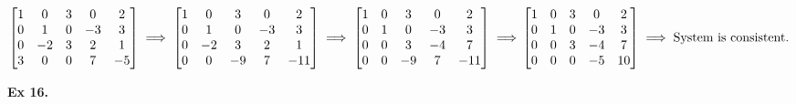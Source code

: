 \documentclass{article}
\begin{document}
$
\begin{bmatrix}
1 &0 &3 &0 &2\\
0 &1 &0 &-3 &3\\
0 &-2 &3 &2 &1\\
3 &0 &0 &7 &-5
\end{bmatrix}
\implies
\begin{bmatrix}
1 &0 &3 &0 &2\\
0 &1 &0 &-3 &3\\
0 &-2 &3 &2 &1\\
0 &0 &-9 &7 &-11
\end{bmatrix}
\implies
\begin{bmatrix}
1 &0 &3 &0 &2\\
0 &1 &0 &-3 &3\\
0 &0 &3 &-4 &7\\
0 &0 &-9 &7 &-11
\end{bmatrix}
\implies\\
\begin{bmatrix}
1 &0 &3 &0 &2\\
0 &1 &0 &-3 &3\\
0 &0 &3 &-4 &7\\
0 &0 &0 &-5 &10
\end{bmatrix}
\implies \text{System is consistent.}
$

\textbf{Ex 16.}
\end{document}
